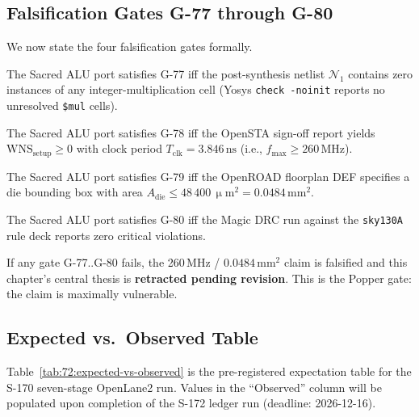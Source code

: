 \subsection{Falsification Gates G-77 through G-80}
\label{subsec:72:gates}

We now state the four falsification gates formally.

\begin{definition}
\label{def:72:g77}
The Sacred ALU port satisfies G-77 iff the post-synthesis netlist
$\mathcal{N}_1$ contains zero instances of any integer-multiplication
cell (Yosys \texttt{check -noinit} reports no unresolved
\texttt{\$mul} cells).
\end{definition}

\begin{definition}
\label{def:72:g78}
The Sacred ALU port satisfies G-78 iff the OpenSTA sign-off report
yields $\mathrm{WNS}_{\text{setup}} \ge 0$ with clock period
$T_{\text{clk}} = 3.846\,\mathrm{ns}$ (i.e., $f_{\max} \ge 260\,\mathrm{MHz}$).
\end{definition}

\begin{definition}
\label{def:72:g79}
The Sacred ALU port satisfies G-79 iff the OpenROAD floorplan DEF
specifies a die bounding box with area $A_{\text{die}} \le
48\,400\,\upmu\mathrm{m}^2 = 0.0484\,\mathrm{mm}^2$.
\end{definition}

\begin{definition}
\label{def:72:g80}
The Sacred ALU port satisfies G-80 iff the Magic DRC run against
the \texttt{sky130A} rule deck reports zero critical violations.
\end{definition}

\noindent
If any gate G-77..G-80 fails, the 260\,MHz / $0.0484\,\mathrm{mm}^2$
claim is falsified and this chapter's central thesis is
\textbf{retracted pending revision}.
This is the Popper gate: the claim is maximally vulnerable.

\subsection{Expected vs.\ Observed Table}
\label{subsec:72:expected-vs-observed}

Table~\ref{tab:72:expected-vs-observed} is the pre-registered expectation
table for the S-170 seven-stage OpenLane2 run.
Values in the ``Observed'' column will be populated upon completion of
the S-172 ledger run (deadline: 2026-12-16).

